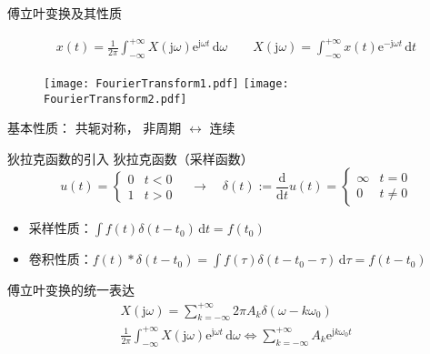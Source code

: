 \documentclass[UTF8]{ctexbeamer}
\begin{document}
\begin{frame}{傅立叶变换及其性质}
    \begin{tcolorbox}[top=0mm,
        title = 傅立叶变换（Fourier Transform）,
        boxrule = 0.3pt,
        fontupper = \normalcolor\small]
        \begin{gather*}
            x(t) = \frac{1}{2\pi} \int_{-\infty}^{+\infty} X(\mathrm{j}\omega) \mathrm{e}^{\mathrm{j}\omega t}\,\mathrm{d}\omega 
            \qquad
            X(\mathrm{j}\omega) = \int_{-\infty}^{+\infty} x(t) \mathrm{e}^{-\mathrm{j}\omega t}\,\mathrm{d}t 
        \end{gather*}
    \end{tcolorbox}
    
    \begin{figure}
        \centering
        \texttt{[image: FourierTransform1.pdf]}
        \hspace{20pt}
        \texttt{[image: FourierTransform2.pdf]}
    \end{figure}

    基本性质：
    共轭对称， 
    非周期 $\leftrightarrow$ 连续
\end{frame}



\begin{frame}{狄拉克函数的引入}
    狄拉克函数（采样函数）
    \begin{equation*}
        u(t) = \left\{\begin{array}{cl}
            0 & t < 0 \\
            1 & t > 0
        \end{array}\right.
        \quad \rightarrow \quad
        \delta (t) := \frac{\mathrm{d}}{\mathrm{d}t} u(t) = \left\{\begin{array}{cl}
            \infty & t = 0 \\
            0 & t \ne 0
        \end{array}\right. 
    \end{equation*}

    \begin{itemize}
        \item 采样性质：$\int f(t) \delta (t-t_0) \, \mathrm{d} t = f(t_0)$
        \item 卷积性质：$f(t) \ast \delta (t-t_0) = \int f(\tau) \delta (t-t_0-\tau) \, \mathrm{d} \tau = f(t-t_0)$
    \end{itemize}

    傅立叶变换的统一表达
    \begin{gather*}
        X(\mathrm{j}\omega) = \sum_{k=-\infty}^{+\infty}  2 \pi A_k \delta (\omega - k\omega_0)\\
        \frac{1}{2\pi} \int_{-\infty}^{+\infty} X(\mathrm{j}\omega) \mathrm{e}^{\mathrm{j}\omega t}\,\mathrm{d}\omega 
        \Leftrightarrow  \sum_{k=-\infty}^{+\infty} A_k \mathrm{e}^{\mathrm{j}k\omega_0t}  
    \end{gather*}
\end{frame}
\end{document}
